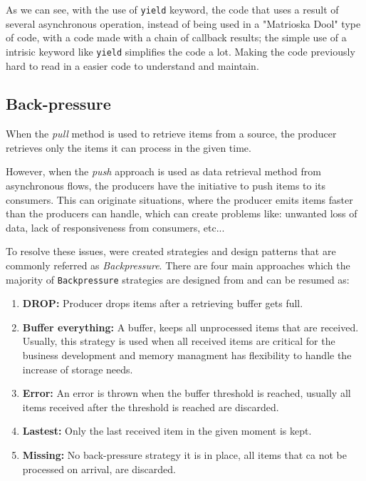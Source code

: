As we can see, with the use of \texttt{yield} keyword, the code that uses a result of several asynchronous operation, instead of being used in a "Matrioska Dool" type of code, with a code made with a chain of callback results; 
the simple use of a intrisic keyword like \texttt{yield} simplifies the code a lot. Making the code previously hard to read in a easier code to understand and maintain.  
	
	\clearpage

	\subsection{Back-pressure} 

	When the \textit{pull} method is used to retrieve items from a source, the producer retrieves only the items it can process in the given time. 
	
	However, when the \textit{push} approach is used as data retrieval method from asynchronous flows, the producers have the initiative to push items to its consumers. 
	This can originate situations, where the producer emits items faster than the producers can handle, which can create problems like: unwanted loss of data, lack of responsiveness from consumers, etc... 
	
	To resolve these issues, were created strategies and design patterns that are commonly referred as \textit{Backpressure}.
	There are four main approaches which the majority of \texttt{Backpressure} strategies are designed from and can be resumed as: 
	
	\begin{enumerate}
		\item \textbf{DROP:} Producer drops items after a retrieving buffer gets full.
		\item \textbf{Buffer everything:} A buffer, keeps all unprocessed items that are received. Usually, this strategy is used when all received items are critical for the business development and memory managment has flexibility to handle the increase of storage needs.
		\item \textbf{Error:} An error is thrown when the buffer threshold is reached, usually all items received after the threshold is reached are discarded.
		\item \textbf{Lastest:} Only the last received item in the given moment is kept.
		\item \textbf{Missing:} No back-pressure strategy it is in place, all items that ca not be processed on arrival, are discarded.
	\end{enumerate}
	\clearpage

